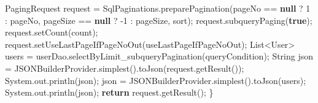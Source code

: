 \documentclass[
]{book}
\newenvironment{Shaded}{\begin{snugshade}}{\end{snugshade}}
\newcommand{\BuiltInTok}[1]{#1}
\newcommand{\DecValTok}[1]{\textcolor[rgb]{0.00,0.00,0.81}{#1}}
\newcommand{\FunctionTok}[1]{\textcolor[rgb]{0.00,0.00,0.00}{#1}}
\newcommand{\KeywordTok}[1]{\textcolor[rgb]{0.13,0.29,0.53}{\textbf{#1}}}
\newcommand{\NormalTok}[1]{#1}
\begin{document}
\begin{Shaded}
\begin{Highlighting}[]
\NormalTok{        PagingRequest request = SqlPaginations.}\FunctionTok{preparePagination}\NormalTok{(pageNo == }\KeywordTok{null}\NormalTok{ ? }\DecValTok{1}\NormalTok{ : pageNo, pageSize == }\KeywordTok{null}\NormalTok{ ? -}\DecValTok{1}\NormalTok{ : pageSize, sort);}
\NormalTok{        request.}\FunctionTok{subqueryPaging}\NormalTok{(}\KeywordTok{true}\NormalTok{);}
\NormalTok{        request.}\FunctionTok{setCount}\NormalTok{(count);}
\NormalTok{        request.}\FunctionTok{setUseLastPageIfPageNoOut}\NormalTok{(useLastPageIfPageNoOut);}
        \BuiltInTok{List}\NormalTok{<User> users = userDao.}\FunctionTok{selectByLimit_subqueryPagination}\NormalTok{(queryCondition);}
        \BuiltInTok{String}\NormalTok{ json = JSONBuilderProvider.}\FunctionTok{simplest}\NormalTok{().}\FunctionTok{toJson}\NormalTok{(request.}\FunctionTok{getResult}\NormalTok{());}
        \BuiltInTok{System}\NormalTok{.}\FunctionTok{out}\NormalTok{.}\FunctionTok{println}\NormalTok{(json);}
\NormalTok{        json = JSONBuilderProvider.}\FunctionTok{simplest}\NormalTok{().}\FunctionTok{toJson}\NormalTok{(users);}
        \BuiltInTok{System}\NormalTok{.}\FunctionTok{out}\NormalTok{.}\FunctionTok{println}\NormalTok{(json);}
        \KeywordTok{return}\NormalTok{ request.}\FunctionTok{getResult}\NormalTok{();}
\NormalTok{    \}}


\end{Highlighting}
\end{Shaded}
\end{document}
